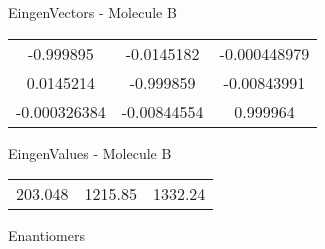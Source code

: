 \begin{multicols}{2}
\begin{center}
\vtab
 EingenVectors - Molecule B     \\
\vtab
\begin{tabular}{|c c c|}
-0.999895	 & 	-0.0145182	 & 	-0.000448979	 \\
0.0145214	 & 	-0.999859	 & 	-0.00843991	 \\
-0.000326384	 & 	-0.00844554	 & 	0.999964
\end{tabular}

\vtab
 EingenValues - Molecule B     \\
\vtab
\begin{tabular}{|c c c|}
203.048	 & 	1215.85	 & 	1332.24	 \\
\end{tabular}

\end{center}
\end{multicols}
\begin{center}
\vtab
\vtab
\textcolor{NavyBlue}{\Large Enantiomers}
\end{center}

 \newpage

